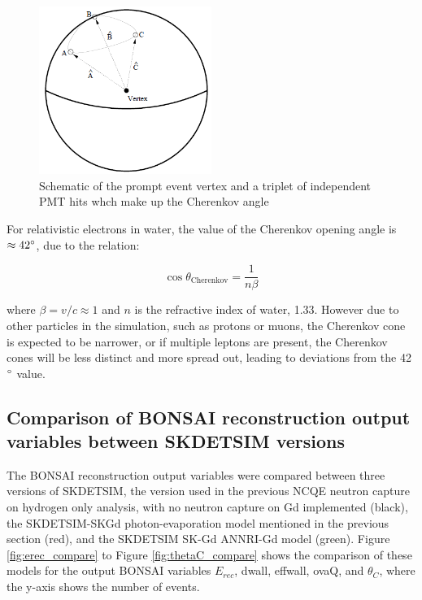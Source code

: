 \begin{figure}
    \centering
    \includegraphics[width=0.5\textwidth]{Figures/cherenkov_hit_triplet.png}
    \caption{Schematic of the prompt event vertex and a triplet of independent PMT hits whch make up the Cherenkov angle}
    \label{fig:cherenkov_hit_triplet}

\end{figure}


 For relativistic electrons in water, the value of the Cherenkov opening angle is $\approx 42\degree$, due to the relation: 

 \begin{equation}
\cos \theta_{\mathrm{Cherenkov}}=\frac{1}{n\beta}
\label{cherenkov_angle}
\end{equation}
 
where $\beta = v/c \approx 1$ and $n$ is the refractive index of water, 1.33. However due to other particles in the simulation, such as protons or muons, the Cherenkov cone is expected to be narrower, or if multiple leptons are present, the Cherenkov cones will be less distinct and more spread out, leading to deviations from the 42$\degree$ value. 

\subsection{Comparison of BONSAI reconstruction output variables between SKDETSIM versions}

The BONSAI reconstruction output variables were compared between three versions of SKDETSIM, the version used in the previous NCQE neutron capture on hydrogen only analysis, with no neutron capture on Gd implemented (black), the SKDETSIM-SKGd photon-evaporation model mentioned in the previous section (red), and the SKDETSIM SK-Gd ANNRI-Gd model (green). Figure \ref{fig:erec_compare} to Figure \ref{fig:thetaC_compare} shows the comparison of these models for the output BONSAI variables $E_{rec}$, dwall, effwall, ovaQ, and $\theta_C$, where the y-axis shows the number of events.

